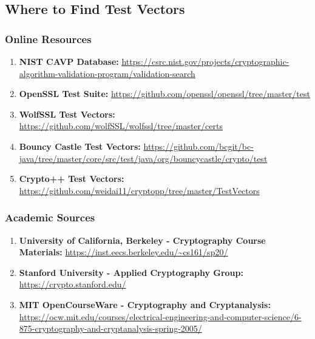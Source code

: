 \documentclass[11pt,a4paper]{article}
\begin{document}
\subsection{Where to Find Test Vectors}

\subsubsection{Online Resources}

\begin{enumerate}
    \item \textbf{NIST CAVP Database:} \url{https://csrc.nist.gov/projects/cryptographic-algorithm-validation-program/validation-search}
    
    \item \textbf{OpenSSL Test Suite:} \url{https://github.com/openssl/openssl/tree/master/test}
    
    \item \textbf{WolfSSL Test Vectors:} \url{https://github.com/wolfSSL/wolfssl/tree/master/certs}
    
    \item \textbf{Bouncy Castle Test Vectors:} \url{https://github.com/bcgit/bc-java/tree/master/core/src/test/java/org/bouncycastle/crypto/test}
    
    \item \textbf{Crypto++ Test Vectors:} \url{https://github.com/weidai11/cryptopp/tree/master/TestVectors}
\end{enumerate}

\subsubsection{Academic Sources}

\begin{enumerate}
    \item \textbf{University of California, Berkeley - Cryptography Course Materials:} \url{https://inst.eecs.berkeley.edu/~cs161/sp20/}
    
    \item \textbf{Stanford University - Applied Cryptography Group:} \url{https://crypto.stanford.edu/}
    
    \item \textbf{MIT OpenCourseWare - Cryptography and Cryptanalysis:} \url{https://ocw.mit.edu/courses/electrical-engineering-and-computer-science/6-875-cryptography-and-cryptanalysis-spring-2005/}
\end{enumerate}
\end{document}
